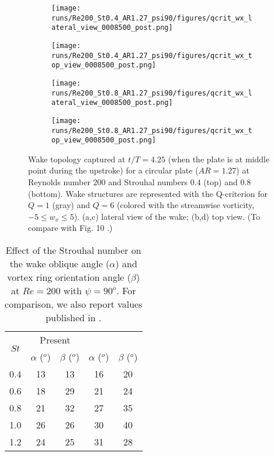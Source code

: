 \begin{figure}
  \centering
  \begin{subfigure}[]{0.45\textwidth}
    \centering
    \texttt{[image: runs/Re200\_St0.4\_AR1.27\_psi90/figures/qcrit\_wx\_lateral\_view\_0008500\_post.png]}
    \caption{}
    \label{fig:strouhal_wake_topology:0.4_lateral}
  \end{subfigure}
  \hfill
  \begin{subfigure}[]{0.45\textwidth}
    \centering
    \texttt{[image: runs/Re200\_St0.4\_AR1.27\_psi90/figures/qcrit\_wx\_top\_view\_0008500\_post.png]}
    \caption{}
    \label{fig:strouhal_wake_topology:0.4_top}
  \end{subfigure}
  \vspace{1cm}
  \begin{subfigure}[]{0.45\textwidth}
    \centering
    \texttt{[image: runs/Re200\_St0.8\_AR1.27\_psi90/figures/qcrit\_wx\_lateral\_view\_0008500\_post.png]}
    \caption{}
    \label{fig:strouhal_wake_topology:0.8_lateral}
  \end{subfigure}
  \hfill
  \begin{subfigure}[]{0.45\textwidth}
    \centering
    \texttt{[image: runs/Re200\_St0.8\_AR1.27\_psi90/figures/qcrit\_wx\_top\_view\_0008500\_post.png]}
    \caption{}
    \label{fig:strouhal_wake_topology:0.8_top}
  \end{subfigure}
  \caption{Wake topology captured at $t / T = 4.25$ (when the plate is at middle point during the upstroke) for a circular plate ($AR = 1.27$) at Reynolds number $200$ and Strouhal numbers $0.4$ (top) and $0.8$ (bottom). Wake structures are represented with the Q-criterion for $Q = 1$ (gray) and $Q = 6$ (colored with the streamwise vorticity, $-5 \leq w_x \leq 5$). (a,c) lateral view of the wake; (b,d) top view. (To compare with Fig. 10 \citet{li_dong_2016}.)}
  \label{fig:strouhal_wake_topology}
\end{figure}

\begin{table}
  \centering
  \begin{tabular}{ccccc}
    \hline\hline
    \multirow{2}{*}{$St$} &
      \multicolumn{2}{c}{Present} &
      \multicolumn{2}{c}{\citet{li_dong_2016}} \\
    & $\alpha$ ($^o$) & $\beta$ ($^o$) & $\alpha$ ($^o$) & $\beta$ ($^o$) \\
    \hline
    0.4 & 13 & 13 & 16 & 20 \\
    0.6 & 18 & 29 & 21 & 24 \\
    0.8 & 21 & 32 & 27 & 35 \\
    1.0 & 26 & 26 & 30 & 40 \\
    1.2 & 24 & 25 & 31 & 28 \\
    \hline\hline
  \end{tabular}
  \caption{Effect of the Strouhal number on the wake oblique angle ($\alpha$) and vortex ring orientation angle ($\beta$) at $Re = 200$ with $\psi = 90^o$. For comparison, we also report values published in \citet{li_dong_2016}.}
  \label{tab:strouhal_angles}
\end{table}

